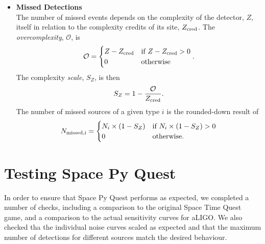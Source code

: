 \documentclass{article}
\begin{document}
\begin{itemize}
\begin{multicols}{2}
        \begin{equation}Z_{\rm mat} = \mathcal{L}
        \end{equation}
\end{multicols}  
Then
\begin{equation}
\mathcal{Z} = Z_{\rm depth} + \sum_{i} Z_i,
\end{equation}
where the complexity due to the detector's depth, $Z_{\rm depth}$, is a
linear interpolation of approximated depth and complexity data, and
$i$ represents a source of complexity.
\item\textbf{Missed Detections}\\
    The number of missed events depends on the complexity of the
    detector, $Z$, itself in relation to the complexity credits of its
    site, $Z_{\rm cred}$. The \textit{overcomplexity}, $\mathcal{O}$, is
    \begin{equation}
    \mathcal{O} = \begin{cases}
                  Z - Z_{\rm cred} & \text{if $ Z - Z_{\rm cred} > 0$} \\
                  0 & \text{otherwise}
                  \end{cases}.
    \end{equation}
    The complexity \textit{scale}, $S_{Z}$, is then
    \begin{equation}
    S_{Z} = 1 - \frac{\mathcal{O}}{Z_{\rm cred}}.
    \end{equation}
    The number of missed sources of a given type $i$ is the rounded-down result of
    \begin{equation}
    N_{\rm missed, i} = \begin{cases}
                    N_i \times (1 - S_Z) & \text{if $N_i \times (1 - S_Z) > 0$} \\
                    0 & \text{otherwise}.
                    \end{cases}
    \end{equation}
\end{itemize}



\section{Testing Space Py Quest}
\label{sec:testing}
In order to ensure that Space Py Quest performs as expected, we
completed a number of checks, including a comparison to the
original Space Time Quest game, and a comparison to the actual sensitivity curves for
aLIGO. 
We also checked tha the individual noise curves scaled
as expected and that the maximum number of detections
for different sources match the desired behaviour.
\label{sec:mcmc}
\end{document}
